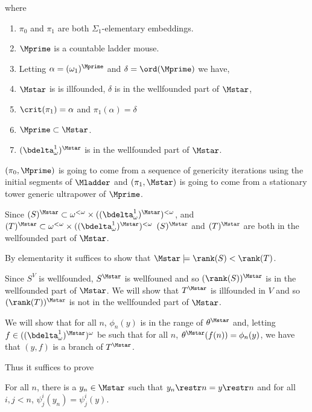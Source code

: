 \documentclass[oneside,12pt]{amsart}
\begin{document}
where

\begin{enumerate}
\item $\pi_0$ and $\pi_1$ are both $\Sigma_1$-elementary embeddings.
\item $\Mprime$ is a countable ladder mouse.
\item Letting $\alpha=(\omega_1)^{\Mprime}$ and $\delta=\ord(\Mprime)$ we have,
\item $\Mstar$ is is illfounded, $\delta$ is in the wellfounded part of $\Mstar$,
\item $\crit(\pi_1) = \alpha$ and $\pi_1(\alpha)=\delta$
\item $\Mprime \subset \Mstar$.
\item $(\bdelta^1_\omega)^{\Mstar}$ is in the wellfounded part of $\Mstar$.
\end{enumerate}

$(\pi_0, \Mprime)$ is going to come from a sequence of genericity iterations using
the initial segments of $\Mladder$ and $(\pi_1,\Mstar)$
is going to come from a stationary tower generic ultrapower of $\Mprime$.

Since $(S)^{\Mstar} \subset \omega^{<\omega}\times ((\bdelta^1_\omega)^{\Mstar})^{<\omega}$,
and
$(T)^{\Mstar} \subset \omega^{<\omega}\times ((\bdelta^1_\omega)^{\Mstar})^{<\omega}$
$(S)^{\Mstar}$ and $(T)^{\Mstar}$ are both in the wellfounded part of $\Mstar$.

By elementarity it suffices to show that $\Mstar \models \rank(S) < \rank(T)$.

Since $S^V$ is wellfounded, $S^{\Mstar}$ is wellfouned and so $(\rank(S))^{\Mstar}$ is in the
wellfounded part of $\Mstar$. We will show that $T^{\Mstar}$
is illfounded in $V$ and so $(\rank(T))^{\Mstar}$ is not in the wellfounded part of $\Mstar$.

We will show that for all $n$, $\phi_n(y)$ is in the range of $\theta^{\Mstar}$ and,
letting $f\in ((\bdelta^1_\omega)^{\Mstar})^{\omega}$ be such that for all $n$,
$\theta^{\Mstar}(f(n)) = \phi_n(y)$, we have that $(y,f)$ is a branch of $T^{\Mstar}$.

Thus it suffices to prove

\begin{lemma}
For all $n$, there is a $y_n\in \Mstar$ such that $y_n\restr n = y \restr n$ and
for all $i,j < n$, $\psi^i_j(y_n) = \psi^i_j(y)$.
\end{lemma}



\end{document}
